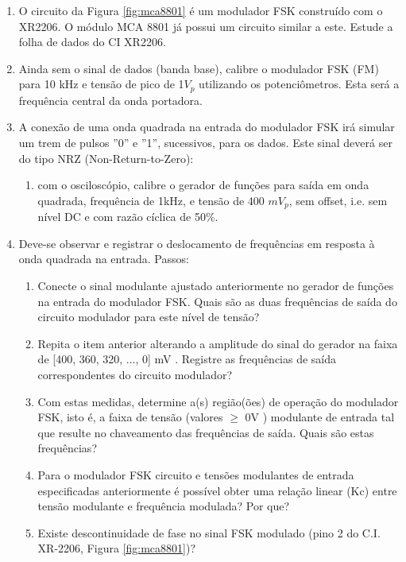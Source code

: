 \begin{enumerate}[label=\Roman*]
    \item O circuito da Figura \ref{fig:mca8801} é um modulador FSK construído com o XR2206. O módulo MCA 8801 já possui um circuito similar a este. Estude a folha de dados do CI XR2206.
    
    \item Ainda sem o sinal de dados (banda base), calibre o modulador FSK (FM) para 10 kHz e tensão de pico de 1$V_p$ utilizando os potenciômetros. Esta será a frequência central da onda portadora.
    
    \item A conexão de uma onda quadrada na entrada do modulador FSK irá simular um trem de pulsos ”0” e ”1”, sucessivos, para os dados. Este sinal deverá ser do tipo NRZ (Non-Return-to-Zero):
    
    \begin{enumerate}[label=\alph*]
        \item com o osciloscópio, calibre o gerador de funções para saída em onda quadrada, frequência de 1kHz, e tensão de 400 $mV_p$, sem offset, i.e. sem nível DC e com razão cíclica de 50\%.
    \end{enumerate}

    \item Deve-se observar e registrar o deslocamento de frequências em resposta à onda quadrada na entrada. Passos:
    
    \begin{enumerate}[label=\alph*]
        \item Conecte o sinal modulante ajustado anteriormente no gerador de funções na entrada do modulador FSK. Quais são as duas frequências de
        saída do circuito modulador para este nível de tensão?
        
        \item Repita o item anterior alterando a amplitude do sinal do gerador na faixa de [400, 360, 320, ..., 0] mV . Registre as frequências de saída correspondentes do circuito modulador?
        
        \item Com estas medidas, determine a(s) região(ões) de operação do modulador FSK, isto é, a faixa de tensão (valores $\ge$ 0V ) modulante de entrada tal que resulte no chaveamento das frequências de saída. Quais são estas frequências?
        
        \item Para o modulador FSK circuito e tensões modulantes de entrada especificadas anteriormente é possível obter uma relação linear (Kc) entre tensão modulante e frequência modulada? Por que?
        
        \item Existe descontinuidade de fase no sinal FSK modulado (pino 2 do C.I. XR-2206, Figura \ref{fig:mca8801})?
    \end{enumerate}  
\end{enumerate}

